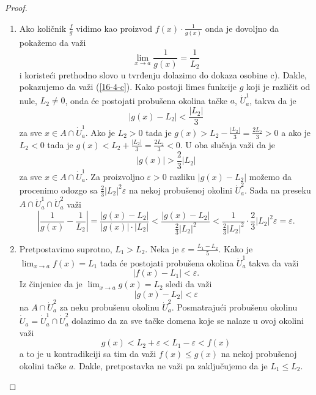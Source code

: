 \documentclass[a4paper,12pt]{article}
\theoremstyle{plain}
\theoremstyle{definition}
\theoremstyle{remark}
\begin{document}
\begin{proof}
\begin{enumerate}[label=\alph*)]
        \item Ako količnik $\frac{f}{g}$ vidimo kao proizvod $f(x) \cdot \frac{1}{g(x)}$ onda je dovoljno da pokažemo da važi
        \begin{equation} \lim_{x \to a} \frac{1}{g(x)} = \frac{1}{L_2} \label{16-4-c}\end{equation}
        i koristeći prethodno slovo u tvrđenju dolazimo do dokaza osobine c). Dakle, pokazujemo da važi (\ref{16-4-c}). Kako postoji limes funkcije $g$ koji je različit od nule, $L_2 \neq 0$, onda će postojati probušena okolina tačke $a$, $\dot{U}_a^1$, takva da je
        \[ |g(x) - L_2| < \frac{|L_2|}{3} \]
        za sve $x \in A \cap \dot{U}_a^1$. Ako je $L_2 > 0$ tada je $\displaystyle g(x) > L_2 - \frac{|L_2|}{3} = \frac{2L_2}{3} > 0$ a ako je $L_2 < 0$ tada je $\displaystyle g(x) < L_2 + \frac{|L_2|}{3} = \frac{2L_2}{3} < 0$. U oba slučaja važi da je
        \[ |g(x)| > \frac{2}{3}|L_2| \]
        za sve $x \in A \cap \dot{U}_a^1$. Za proizvoljno $\varepsilon > 0$ razliku $|g(x) - L_2|$ možemo da procenimo odozgo sa $\frac{2}{3}|L_2|^2 \varepsilon$ na nekoj probušenoj okolini $\dot{U}_a^2$. Sada na preseku $A \cap \dot{U}_a^1 \cap \dot{U}_a^2$ važi
        \[ \left| \frac{1}{g(x)} - \frac{1}{L_2} \right| = \frac{|g(x) - L_2|}{|g(x)| \cdot |L_2|} < \frac{|g(x) - L_2|}{\frac{2}{3}|L_2|^2} < \frac{1}{\frac{2}{3}|L_2|^2} \cdot \frac{2}{3}|L_2|^2 \varepsilon = \varepsilon. \]

        \item Pretpostavimo suprotno, $L_1 > L_2$. Neka je $\displaystyle \varepsilon = \frac{L_1 - L_2}{5}$. Kako je $\displaystyle \lim_{x \to a} f(x) = L_1$ tada će postojati probušena okolina $\dot{U}_a^1$ takva da važi
        \[ |f(x) - L_1| < \varepsilon. \]
        Iz činjenice da je $\displaystyle \lim_{x \to a} g(x) = L_2$ sledi da važi
        \[ |g(x) - L_2| < \varepsilon \]
        na $A \cap \dot{U}_a^2$ za neku probušenu okolinu $\dot{U}_a^2$. Posmatrajući probušenu okolinu $\dot{U}_a = \dot{U}_a^1 \cap \dot{U}_a^2$ dolazimo da za sve tačke domena koje se nalaze u ovoj okolini važi
        \[ g(x) < L_2 + \varepsilon < L_1 - \varepsilon < f(x) \]
        a to je u kontradikciji sa tim da važi $f(x) \le g(x)$ na nekoj probušenoj okolini tačke $a$. Dakle, pretpostavka ne važi pa zaključujemo da je $L_1 \le L_2$.
    \end{enumerate}
\end{proof}
\end{document}
